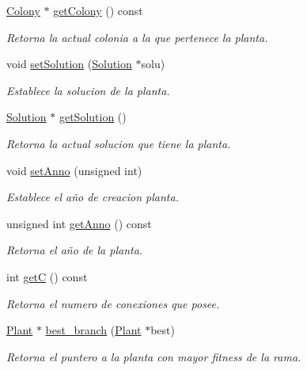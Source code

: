 \begin{DoxyCompactItemize}
\hyperlink{class_colony}{Colony} $\ast$ \hyperlink{class_plant_a8c2f0050ea6d88863bd1703d2252606e}{get\+Colony} () const 
\begin{DoxyCompactList}\small\item\em Retorna la actual colonia a la que pertenece la planta. \end{DoxyCompactList}\item 
void \hyperlink{class_plant_ada85019a597aa6d6e3655cc727e8f675}{set\+Solution} (\hyperlink{class_solution}{Solution} $\ast$solu)
\begin{DoxyCompactList}\small\item\em Establece la solucion de la planta. \end{DoxyCompactList}\item 
\hyperlink{class_solution}{Solution} $\ast$ \hyperlink{class_plant_abc664a5111f99ef2dc172b10b8451f84}{get\+Solution} ()
\begin{DoxyCompactList}\small\item\em Retorna la actual solucion que tiene la planta. \end{DoxyCompactList}\item 
void \hyperlink{class_plant_a3a6c02eec89ad04003c7cb6d5769bd6e}{set\+Anno} (unsigned int)
\begin{DoxyCompactList}\small\item\em Establece el año de creacion planta. \end{DoxyCompactList}\item 
unsigned int \hyperlink{class_plant_a7e59304c381b9e930ec70207ce888310}{get\+Anno} () const 
\begin{DoxyCompactList}\small\item\em Retorna el año de la planta. \end{DoxyCompactList}\item 
int \hyperlink{class_plant_a79fc3e80a225263ba150952e49b4533c}{get\+C} () const 
\begin{DoxyCompactList}\small\item\em Retorna el numero de conexiones que posee. \end{DoxyCompactList}\item 
\hyperlink{class_plant}{Plant} $\ast$ \hyperlink{class_plant_ac53b418a18dc6e37e94c3505b04a0a08}{best\+\_\+branch} (\hyperlink{class_plant}{Plant} $\ast$best)
\begin{DoxyCompactList}\small\item\em Retorna el puntero a la planta con mayor fitness de la rama. \end{DoxyCompactList}\item 

\end{DoxyCompactItemize}
